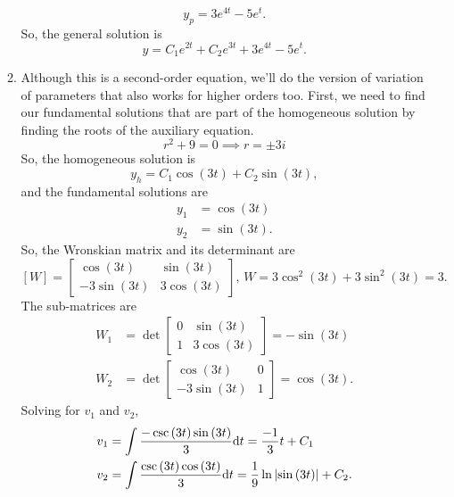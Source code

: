 \begin{enumerate}[label=\arabic*.]
\begin{enumerate}[label=(\alph*)]
\begin{equation*}
					y_p = 3e^{4t} - 5e^{t}.
				\end{equation*}
				So, the general solution is
				\begin{equation*}
					y = C_1e^{2t} + C_2e^{3t} + 3e^{4t} - 5e^{t}.
				\end{equation*}
			\item
				Although this is a second-order equation, we'll do the version of variation of parameters that also works for higher orders too.
				First, we need to find our fundamental solutions that are part of the homogeneous solution by finding the roots of the auxiliary equation.
				\begin{equation*}
					r^2 + 9 = 0 \implies r = \pm 3i
				\end{equation*}
				So, the homogeneous solution is
				\begin{equation*}
					y_h = C_1\cos{(3t)} + C_2\sin{(3t)},
				\end{equation*}
				and the fundamental solutions are
				\begin{align*}
					y_1 &= \cos{(3t)} \\
					y_2 &= \sin{(3t)}.
				\end{align*}
				So, the Wronskian matrix and its determinant are
				\begin{equation*}
					\left[W\right] = \begin{bmatrix}
						\cos{(3t)} & \sin{(3t)} \\
						-3\sin{(3t)} & 3\cos{(3t)}
					\end{bmatrix} \text{, } W = 3\cos^2{(3t)} + 3\sin^2{(3t)} = 3.
				\end{equation*}
				The sub-matrices are
				\begin{align*}
					W_1 &= \det\begin{bmatrix}
						0 & \sin{(3t)} \\
						1 & 3\cos{(3t)}
					\end{bmatrix} = -\sin{(3t)} \\
					 W_2 &= \det\begin{bmatrix}
						\cos{(3t)} & 0 \\
						-3\sin{(3t)} & 1
					\end{bmatrix} = \cos{(3t)}.
				\end{align*}
				Solving for $v_1$ and $v_2$,
				\begin{align*}
					v_1 &= \int{\frac{-\csc{(3t)}\sin{(3t)}}{3} \mathrm{d}t} = \frac{-1}{3}t + C_1 \\
					v_2 &= \int{\frac{\csc{(3t)}\cos{(3t)}}{3} \mathrm{d}t} = \frac{1}{9}\ln{\abs{\sin{(3t)}}} + C_2.

\end{align*}
\end{enumerate}
\end{enumerate}

